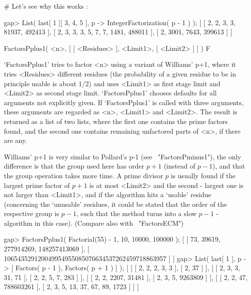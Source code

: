 # Let's see why this works :

gap> List( last[ 1 ]{[ 3, 4, 5 ]}, p -> IntegerFactorization( p - 1 ) );
[ [ 2, 2, 3, 3, 81937, 492413 ], [ 2, 3, 3, 3, 5, 7, 7, 1481, 488011 ], 
  [ 2, 3001, 7643, 399613 ] ]
\endexample


\>FactorsPplus1( <n>, [ [ <Residues> ], <Limit1>, [ <Limit2> ] ] ) F

`FactorsPplus1' tries to factor <n> using a variant of Williams' p+1, 
where it tries <Residues> different residues (the probability of a 
given residue to be in principle usable is about 1/2) and 
uses <Limit1> as first stage limit and <Limit2> as second stage
limit. `FactorsPplus1' chooses defaults for all arguments
not explicitly given.
If `FactorsPplus1' is called with three arguments, these arguments
are regarded as <n>, <Limit1> and <Limit2>.
The result is returned as a list of two lists, where the first one 
contains the prime factors found, and the second one contains
remaining unfactored parts of <n>, if there are any.

Williams' p+1 is very similar to Pollard's p-1 
(see ~"FactorsPminus1"), the only difference is that the group 
used here has order $p+1$ (instead of $p-1$), and that the group
operation takes more time.
A prime divisor $p$ is usually found if the largest prime factor
of $p+1$ is at most <Limit2> and the second - largest one is not
larger than <Limit1>, and if the algorithm hits a \lq usable'
residue (concerning the \lq unusable' residues, it could be stated
that the order of the respective group is $p-1$, such that
the method turns into a slow $p-1$ - algorithm in this case).
(Compare also with ~"FactorsECM")

\beginexample
gap> FactorsPplus1( Factorial(55) - 1, 10, 10000, 100000 );
[ [ 73, 39619, 277914269, 148257413069 ], 
  [ 106543529120049954955085076634537262459718863957 ] ]
gap> List( last[ 1 ], p -> [ Factors( p - 1 ), Factors( p + 1 ) ] );
[ [ [ 2, 2, 2, 3, 3 ], [ 2, 37 ] ], 
  [ [ 2, 3, 3, 31, 71 ], [ 2, 2, 5, 7, 283 ] ], 
  [ [ 2, 2, 2207, 31481 ], [ 2, 3, 5, 9263809 ] ], 
  [ [ 2, 2, 47, 788603261 ], [ 2, 3, 5, 13, 37, 67, 89, 1723 ] ] ]
\endexample



